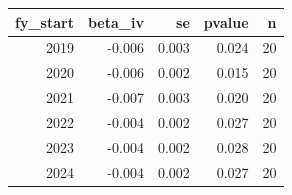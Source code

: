 \begin{tabular}{rrrrr}
\toprule
fy_start & beta_iv & se & pvalue & n \\
\midrule
2019 & -0.006 & 0.003 & 0.024 & 20 \\
2020 & -0.006 & 0.002 & 0.015 & 20 \\
2021 & -0.007 & 0.003 & 0.020 & 20 \\
2022 & -0.004 & 0.002 & 0.027 & 20 \\
2023 & -0.004 & 0.002 & 0.028 & 20 \\
2024 & -0.004 & 0.002 & 0.027 & 20 \\
\bottomrule
\end{tabular}
